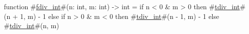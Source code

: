 function #\hyperref[sailMIPSzfdivzyint]{fdiv\_int}#(n: int, m: int) -> int = {
  if n < 0 & m > 0 then {
    #\hyperref[sailMIPSztdivzyint]{tdiv\_int}#(n + 1, m) - 1
  } else if n > 0 & m < 0 then {
    #\hyperref[sailMIPSztdivzyint]{tdiv\_int}#(n - 1, m) - 1
  } else {
    #\hyperref[sailMIPSztdivzyint]{tdiv\_int}#(n, m)
  }
}
